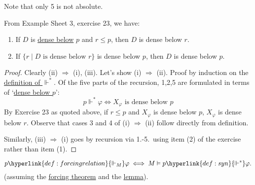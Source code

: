 \documentclass{article}
\newcommand{\1}{\mathbbm{1}}
\let\models\vDash
\let\forces\Vdash
\begin{document}
Note that only 5 is not absolute.

\newlec
From Example Sheet 3, exercise 23, we have:
\begin{enumerate}[(1)]
  \item If $D$ is \hyperlink{def:densebelow}{dense below} $p$ and $r \leq p$, then $D$ is dense below $r$.
  \item If $\{r \mid D \text{ is dense below }r\}$ is dense below $p$, then $D$ is dense below $p$.
\end{enumerate}
\begin{proof}
  Clearly (ii) $\Rightarrow$ (i), (iii).
  Let's show (i) $\Rightarrow$ (ii). Proof by induction on the \hyperlink{def:syn}{definition of $\Vdash^*$}.
  Of the five parts of the recursion, 1,2,5 are formulated in terms of `\hyperlink{def:densebelow}{dense below $p$}':
  \begin{equation*}
    p \Vdash^* \varphi \iff X_\varphi \text{ is dense below } p
  \end{equation*}
  By Exercise 23 as quoted above, if $r \leq p$ and $X_\varphi$ is dense below $p$, $X_\varphi$ is dense below $r$. Observe that cases 3 and 4 of (i) $\Rightarrow$ (ii) follow directly from definition.

  Similarly, (iii) $\Rightarrow$ (i) goes by recursion via 1.-5.\ using item (2) of the exercise rather than item (1).
\end{proof}
\begin{cor}
  \begin{equation*}
  p \hyperlink{def:forcingrelation}{\forces_M} \varphi \iff M \models p \hyperlink{def:syn}{\forces^*} \varphi.
  \end{equation*}
  (assuming the \hyperlink{thm:forcing}{forcing theorem} and the \hyperlink{lem:forc}{lemma}).
\end{cor}
\end{document}
